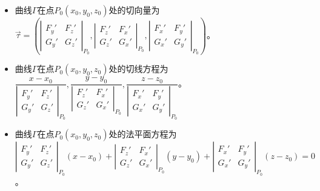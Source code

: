 \begin{itemize}
    \item 曲线$\varGamma$在点$P_0(x_0,y_0,z_0)$处的切向量为\\$\vec{\tau}=\left(\left\vert\begin{array}{cc}
        F_y' & F_z' \\
        G_y' & G_z'
    \end{array}\right\vert_{P_0},\left\vert\begin{array}{ll}
        F_z' & F_x' \\
        G_z' & G_x'
    \end{array}\right\vert_{P_0},\left\vert\begin{array}{ll}
        F_x' & F_y' \\
        G_x' & G_y'
    \end{array}\right\vert_{P_0}\right)$。
    \item 曲线$\varGamma$在点$P_0(x_0,y_0,z_0)$处的切线方程为\\$\dfrac{x-x_0}{\left\vert\begin{array}{cc}
        F_y' & F_z' \\
        G_y' & G_z'
    \end{array}\right\vert_{P_0}},\dfrac{y-y_0}{\left\vert\begin{array}{ll}
        F_z' & F_x' \\
        G_z' & G_x'
    \end{array}\right\vert_{P_0}},\dfrac{z-z_0}{\left\vert\begin{array}{ll}
        F_x' & F_y' \\
        G_x' & G_y'
    \end{array}\right\vert_{P_0}}$。
    \item 曲线$\varGamma$在点$P_0(x_0,y_0,z_0)$处的法平面方程为\\$\left\vert\begin{array}{cc}
        F_y' & F_z' \\
        G_y' & G_z'
    \end{array}\right\vert_{P_0}(x-x_0)+\left\vert\begin{array}{ll}
        F_z' & F_x' \\
        G_z' & G_x'
    \end{array}\right\vert_{P_0}(y-y_0)+\left\vert\begin{array}{ll}
        F_x' & F_y' \\
        G_x' & G_y'
    \end{array}\right\vert_{P_0}(z-z_0)=0$。
\end{itemize}

